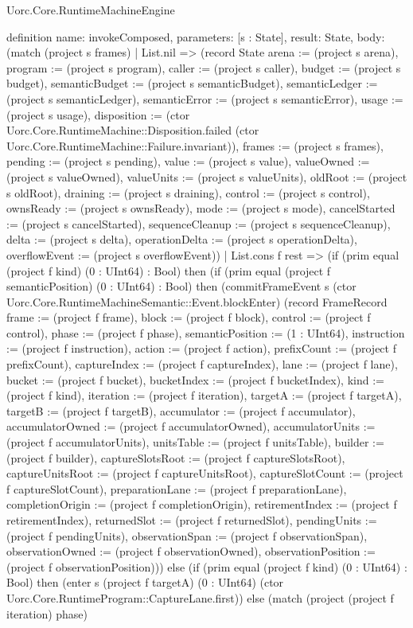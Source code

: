 \begin{lexlean}{Uorc.Core.RuntimeMachineEngine}
\begin{semanticmodule}
definition{
  name: invokeComposed,
  parameters: [s : State],
  result: State,
  body: (match (project s frames)
    | List.nil => (record State {arena := (project s arena), program := (project s program), caller := (project s caller), budget := (project s budget), semanticBudget := (project s semanticBudget), semanticLedger := (project s semanticLedger), semanticError := (project s semanticError), usage := (project s usage), disposition := (ctor Uorc.Core.RuntimeMachine::Disposition.failed (ctor Uorc.Core.RuntimeMachine::Failure.invariant)), frames := (project s frames), pending := (project s pending), value := (project s value), valueOwned := (project s valueOwned), valueUnits := (project s valueUnits), oldRoot := (project s oldRoot), draining := (project s draining), control := (project s control), ownsReady := (project s ownsReady), mode := (project s mode), cancelStarted := (project s cancelStarted), sequenceCleanup := (project s sequenceCleanup), delta := (project s delta), operationDelta := (project s operationDelta), overflowEvent := (project s overflowEvent)})
    | List.cons f rest => (if (prim equal (project f kind) (0 : UInt64) : Bool) then (if (prim equal (project f semanticPosition) (0 : UInt64) : Bool) then (commitFrameEvent s (ctor Uorc.Core.RuntimeMachineSemantic::Event.blockEnter) (record FrameRecord {frame := (project f frame), block := (project f block), control := (project f control), phase := (project f phase), semanticPosition := (1 : UInt64), instruction := (project f instruction), action := (project f action), prefixCount := (project f prefixCount), captureIndex := (project f captureIndex), lane := (project f lane), bucket := (project f bucket), bucketIndex := (project f bucketIndex), kind := (project f kind), iteration := (project f iteration), targetA := (project f targetA), targetB := (project f targetB), accumulator := (project f accumulator), accumulatorOwned := (project f accumulatorOwned), accumulatorUnits := (project f accumulatorUnits), unitsTable := (project f unitsTable), builder := (project f builder), captureSlotsRoot := (project f captureSlotsRoot), captureUnitsRoot := (project f captureUnitsRoot), captureSlotCount := (project f captureSlotCount), preparationLane := (project f preparationLane), completionOrigin := (project f completionOrigin), retirementIndex := (project f retirementIndex), returnedSlot := (project f returnedSlot), pendingUnits := (project f pendingUnits), observationSpan := (project f observationSpan), observationOwned := (project f observationOwned), observationPosition := (project f observationPosition)})) else (if (prim equal (project f kind) (0 : UInt64) : Bool) then (enter s (project f targetA) (0 : UInt64) (ctor Uorc.Core.RuntimeProgram::CaptureLane.first)) else (match (project (project f iteration) phase)
}
\end{semanticmodule}
\end{lexlean}
